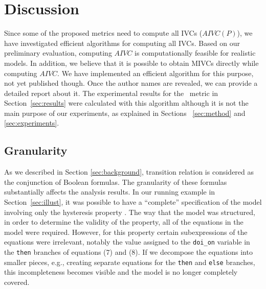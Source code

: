 \section{Discussion}
\label{sec:discussion}
\iffalse As mentioned, IVCs are derived from inductive invariants; in other words, they are built upon the proof of the validity of a given property. One interesting fact about proofs
  is that a given property could be proved from different proof paths.
  The $AIVC$ captures this fact and gives a clear picture of various ways a property is satisfied. By getting all the MIVCs for the system properties and categorizing them, one can find if there are design artifacts that do not trace to any property: set $\bigcap \{IRR (P) | P \in \Delta \}$.  If this set is non-empty, it is a possible indication of ``gold plating" or missing properties \cite{Murugesan16:renext}.
\fi
Since some of the proposed metrics need to compute all IVCs ($AIVC(P)$),
we have investigated efficient algorithms for computing all IVCs.
Based on our preliminary evaluation, computing $AIVC$ is computationally feasible for realistic models. In addition, we believe that it is possible to obtain MIVCs directly while computing $AIVC$. 
We have implemented an efficient algorithm for this purpose, not yet published though. Once the author names are revealed, we can provide a detailed report about it. The experimental results for the \maycov\ metric in Section~\ref{sec:results} were calculated with this algorithm although it is not the main purpose of our experiments, as explained in Sections ~\ref{sec:method} and \ref{sec:experiments}.

\subsection{Granularity}

As we described in Section \ref{sec:background}, transition relation is considered
as the conjunction of Boolean formulas. The granularity of these formulas substantially affects the analysis results.  In our running example in Section~\ref{sec:illust}, it was possible to have a ``complete'' specification of the model involving only the hysteresis property \hystp.  The way that the model was structured, in order to determine the validity of the property, all of the equations in the model were required.  However, for this property certain subexpressions of the equations were irrelevant, notably the value assigned to the \texttt{doi\_on} variable in the \texttt{then} branches of equations (7) and (8).  If we decompose the equations into smaller pieces, e.g., creating separate equations for the \texttt{then} and \texttt{else} branches, this incompleteness becomes visible and the model is no longer completely covered.

